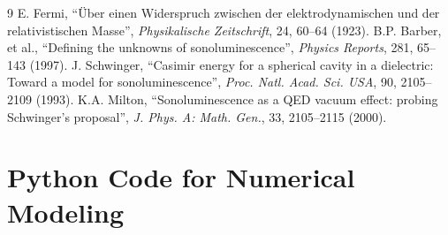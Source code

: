 \documentclass[12pt,a4paper]{article}
\begin{document}
\begin{thebibliography}{9}
 E. Fermi, ``Über einen Widerspruch zwischen der elektrodynamischen und der relativistischen Masse'', \textit{Physikalische Zeitschrift}, 24, 60–64 (1923).
 B.P. Barber, et al., ``Defining the unknowns of sonoluminescence'', \textit{Physics Reports}, 281, 65--143 (1997).
 J. Schwinger, ``Casimir energy for a spherical cavity in a dielectric: Toward a model for sonoluminescence'', \textit{Proc. Natl. Acad. Sci. USA}, 90, 2105--2109 (1993).
 K.A. Milton, ``Sonoluminescence as a QED vacuum effect: probing Schwinger's proposal'', \textit{J. Phys. A: Math. Gen.}, 33, 2105--2115 (2000).
\end{thebibliography}

\appendix
\section{Python Code for Numerical Modeling}
\label{app:python}
\end{document}
